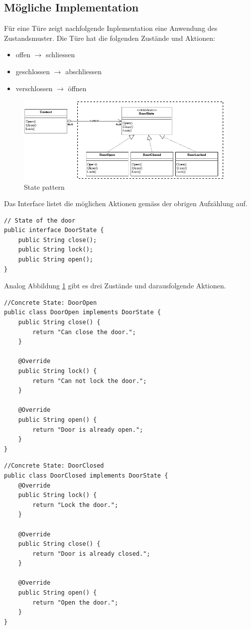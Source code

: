 \documentclass[10pt,a4paper]{article}
\begin{document}
\subsection*{Mögliche Implementation}
%
Für eine Türe zeigt nachfolgende Inplementation eine Anwendung des Zustandsmuster. Die Türe hat die folgenden Zustände und Aktionen:
%
\begin{itemize}
  \item offen $\rightarrow$ schliessen
  \item geschlossen $\rightarrow$  abschliessen
  \item verschlossen $\rightarrow$ öffnen
\end{itemize}
%
\begin{figure}[H]
  \begin{center}
    \includegraphics[width=0.95\textwidth]{state-pattern02.png}
    \caption{State pattern}
    \label{fig:door-state}
  \end{center}
\end{figure}
%
Das Interface listet die möglichen Aktionen gemäss der obrigen Aufzählung auf.
%
\begin{lstlisting}[caption={Interface}]
// State of the door
public interface DoorState {
	public String close();
	public String lock();
	public String open();
}
\end{lstlisting}
%
Analog Abbildung \ref{fig:door-state} gibt es drei Zustände und darausfolgende Aktionen.
%
\begin{lstlisting}[caption={Zustand: Türe geöffnet}]
//Concrete State: DoorOpen
public class DoorOpen implements DoorState {
	public String close() {
		return "Can close the door.";
	}

	@Override
	public String lock() {
		return "Can not lock the door.";
	}

	@Override
	public String open() {
		return "Door is already open.";
	}
}
\end{lstlisting}
%
\begin{lstlisting}[caption={Zustand: Türe geschlossen}]
//Concrete State: DoorClosed
public class DoorClosed implements DoorState {
	@Override
	public String lock() {
		return "Lock the door.";
	}

	@Override
	public String close() {
		return "Door is already closed.";
	}

	@Override
	public String open() {
		return "Open the door.";
	}
}
\end{lstlisting}
\end{document}
